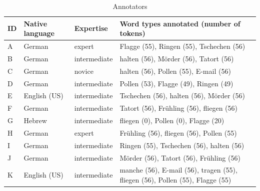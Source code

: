 	
	\begin{table}[htb]
		\centering
		\caption{Annotators }
		
		\begin{tabularx}{\textwidth}{lllX}
		\toprule
		ID & Native language & Expertise & Word types annotated (number of tokens) \newline \TODO{alphabetize}\\
		\midrule
		A	&	German	& expert & Flagge (55),  Ringen (55), Tschechen (56) \\
		
		B	&	German	& intermediate & 	halten (56),  M\"{o}rder (56),     Tatort (56) \\
		
		
		C & German & novice & 	halten (56),  Pollen (55),  E-mail (56)	 \\
		
		D &	German & intermediate &		Pollen (53), Flagge (49),  Ringen (49)	 %
		\\
		
		E & English (US)	& intermediate & 	Tschechen (56),  halten (56),  M\"{o}rder (56) 	 \\
		
		F & 	German	 & intermediate & 	Tatort (56), Fr\"{u}hling (56), fliegen (56)	 \\
		
		G & Hebrew	& intermediate & 	fliegen (0),  Pollen (0), Flagge (20)	 %
		\\
		
		H & German & expert &		Fr\"{u}hling (56), fliegen (56),  Pollen (55) \\
		
		I & 	German & intermediate &		Ringen (55), Tschechen (56), halten (56)	 \\
		
		J &	German	 & intermediate & M\"{o}rder (56),    Tatort (56), Fr\"{u}hling (56) \\
		
		K & English (US)	& intermediate &  manche (56),   E-mail (56),   tragen (55),	    fliegen (56),  Pollen (55), Flagge (55) \\
		

\end{tabularx}
\end{table}
